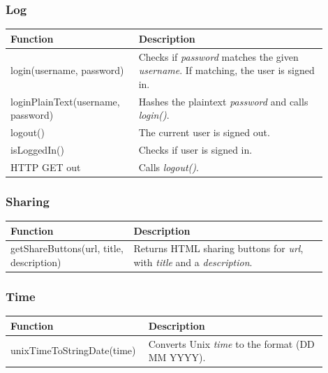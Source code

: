 \subsubsection{Log}
\begin{minipage}{\linewidth}
  \centering
  \setlength{\tabcolsep}{12pt}
  \begin{tabular}{|p{0.35\linewidth}|p{0.55\linewidth}|}
  \hline
  \cellcolor{gray!25} Function & \cellcolor{gray!25} Description \\
  \hline
  login(username, password) & Checks if \textit{password} matches the given \textit{username}. If matching, the user is signed in. \\
  loginPlainText(username, password) & Hashes the plaintext \textit{password} and calls \textit{login()}. \\
  logout() & The current user is signed out. \\
  isLoggedIn() & Checks if user is signed in. \\
  HTTP GET out & Calls \textit{logout()}. \\
  \hline
  \end{tabular}
\end{minipage}

\subsubsection{Sharing}
\begin{minipage}{\linewidth}
  \centering
  \setlength{\tabcolsep}{12pt}
  \begin{tabular}{|p{0.35\linewidth}|p{0.55\linewidth}|}
  \hline
  \cellcolor{gray!25} Function & \cellcolor{gray!25} Description \\
  \hline
  getShareButtons(url, title, description) & Returns HTML sharing buttons for \textit{url}, with \textit{title} and a \textit{description}. \\
  \hline
  \end{tabular}
\end{minipage}

\subsubsection{Time}
\begin{minipage}{\linewidth}
  \centering
  \setlength{\tabcolsep}{12pt}
  \begin{tabular}{|p{0.35\linewidth}|p{0.55\linewidth}|}
  \hline
  \cellcolor{gray!25} Function & \cellcolor{gray!25} Description \\
  \hline
  unixTimeToStringDate(time) & Converts Unix \textit{time} to the format (DD MM YYYY). \\
  \hline
  \end{tabular}
\end{minipage}

